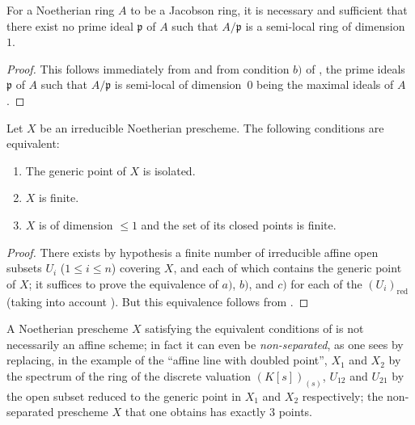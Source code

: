 \begin{corollary}[10.5.2]
\label{IV.10.5.2}
For a Noetherian ring $A$ to be a Jacobson ring, it is necessary and sufficient that there exist no prime ideal $\mathfrak{p}$ of $A$ such that $A/\mathfrak{p}$ is a semi-local ring of dimension $1$.
\end{corollary}

\begin{proof}
This follows immediately from  and from condition $b)$ of , the prime ideals $\mathfrak{p}$ of $A$ such that $A/\mathfrak{p}$ is semi-local of dimension~$0$ being the maximal ideals of $A$.
\end{proof}

\begin{corollary}[10.5.3]
\label{IV.10.5.3}
Let $X$ be an irreducible Noetherian prescheme.
The following conditions are equivalent:
\begin{enumerate}[label=\emph{\alph*)}]
  \item The generic point of $X$ is isolated.
  \item $X$ is finite.
  \item $X$ is of dimension $\leq 1$ and the set of its closed points is finite.
\end{enumerate}
\end{corollary}

\begin{proof}
There exists by hypothesis a finite number of irreducible affine open subsets $U_i$ ($1\leq i\leq n$) covering $X$, and each of which contains the generic point of $X$; it suffices to prove the equivalence of $a)$, $b)$, and $c)$ for each of the $(U_i)_{\mathrm{red}}$ (taking into account ).
But this equivalence follows from .
\end{proof}

\begin{remark}[10.5.4]
\label{IV.10.5.4}
A Noetherian prescheme $X$ satisfying the equivalent conditions of  is not necessarily an affine scheme; in fact it can even be \emph{non-separated}, as one sees by replacing, in the example  of the ``affine line with doubled point'', $X_1$ and $X_2$ by the spectrum of the ring of the discrete valuation $(K[s])_{(s)}$, $U_{12}$ and $U_{21}$ by the open subset reduced to the generic point in $X_1$ and $X_2$ respectively; the non-separated prescheme $X$ that one obtains has exactly $3$ points.
\end{remark}

